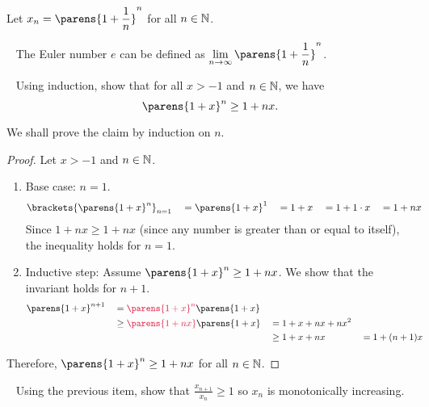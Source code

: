 \begin{problem}
  Let $\displaystyle x_n = \parens{1 + \frac{1}{n}}^n$
  for all $n \in \mathbb{N}$.

  \begin{remark}~\label{remark:euler}
    The Euler number $e$ can be defined as
    $\displaystyle \lim_{n \to \infty}{\parens{1 + \frac{1}{n}}^n}$.
  \end{remark}

  \begin{enumroman}
    \item~\label{step:2.1} Using induction, show that for all $x > -1$ and $n \in \mathbb{N}$, we have
      \[ \parens{1 + x}^n \geq 1 + nx. \]

      \begin{answer}
        We shall prove the claim by induction on $n$.

        \begin{proof}
          Let $x > -1$ and $n \in \mathbb{N}$.
          \begin{enumerate}
            \item Base case: $n = 1$.
              \begin{alignat*}{5}
                &\brackets{\parens{1 + x}^n}_{n=1} &&= \parens{1 + x}^1 &&= 1 + x &&= 1 + 1 \cdot x &&= 1 + nx
              \end{alignat*}
              Since $1 + nx \geq 1 + nx$ (since any number is 
              greater than or equal to itself), the inequality holds for $n = 1$.
            \item Inductive step: Assume $\parens{1 + x}^n \geq 1 + nx$.
              We show that the invariant holds for $n+1$.
              \begin{alignat*}{5}
                &\parens{1 + x}^{n+1} &&= \crim{\parens{1 + x}^n} \parens{1 + x} \\
                & &&\geq \crim{\parens{1 + nx}} \parens{1 + x} &&= 1 + x + nx + nx^2 \\
                & && &&\geq 1 + x + nx &&= 1 + (n+1)x
              \end{alignat*}
          \end{enumerate}
          Therefore, $\parens{1 + x}^n \geq 1 + nx$ for all $n \in \mathbb{N}$.
        \end{proof}
      \end{answer}

    \newpage
    \item~\label{step:2.2} Using the previous item, show that
      $\displaystyle  \frac{x_{n+1}}{x_n} \geq 1$ so $x_n$
      is monotonically increasing.


\end{enumroman}
\end{problem}
